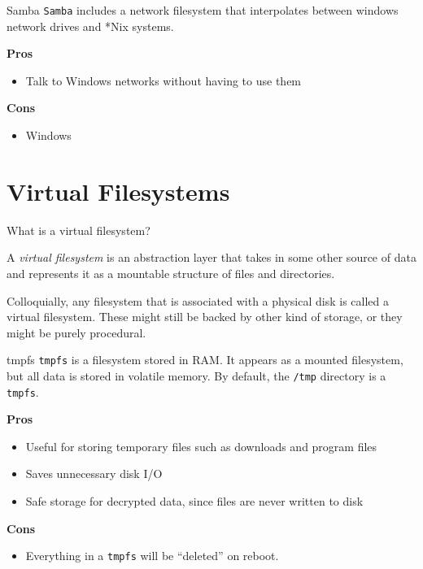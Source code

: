 \documentclass{lug}
\begin{document}
\begin{frame}{Samba}
\texttt{Samba} includes a network filesystem that interpolates between windows
network drives and *Nix systems. 

\textbf{Pros}
\begin{itemize}
    \item Talk to Windows networks without having to use them
\end{itemize}

\textbf{Cons}
\begin{itemize}
    \item Windows
\end{itemize}
\end{frame}

\section{Virtual Filesystems}
\begin{frame}{What is a virtual filesystem?}
\begin{center}
    A \emph{virtual filesystem} is an abstraction layer that takes in some other
    source of data and represents it as a mountable structure of files and
    directories.

    Colloquially, any filesystem that is associated with a physical disk is
    called a virtual filesystem. These might still be backed by other kind of
    storage, or they might be purely procedural.
\end{center}
\end{frame}

\begin{frame}{tmpfs}
    \texttt{tmpfs} is a filesystem stored in RAM. It appears as a mounted
    filesystem, but all data is stored in volatile memory. By default, the
    \texttt{/tmp} directory is a \texttt{tmpfs}.

    \textbf{Pros}
    \begin{itemize}
        \item Useful for storing temporary files such as downloads and program
            files
        \item Saves unnecessary disk I/O
        \item Safe storage for decrypted data, since files are never written to
            disk
    \end{itemize}

    \textbf{Cons}
    \begin{itemize}
        \item Everything in a \texttt{tmpfs} will be ``deleted'' on reboot.
    \end{itemize}
\end{frame}
\end{document}
